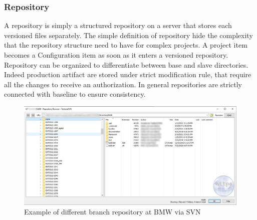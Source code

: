 \documentclass[../main.tex]{subfiles}
\begin{document}
\subsubsection{Repository}
A repository is simply a structured repository on a server that stores each versioned files separately. The simple definition of repository hide the complexity that the repository structure need to have for complex projects. A project item becomes a Configuration item as soon as it enters a versioned repository. \\
Repository can be organized to differentiate between base and slave directories. Indeed production artifact are stored under strict modification rule, that require all the changes to receive an authorization.  In general repositories are strictly connected with baseline to ensure consistency. 
\begin{figure}[H]
    \centering
    \includegraphics[width=\linewidth]{images_folder/repobroswer.png.jpg}
    \caption{Example of different branch repository at BMW via SVN}
    \label{fig:BMWREPO}
\end{figure}
\end{document}
